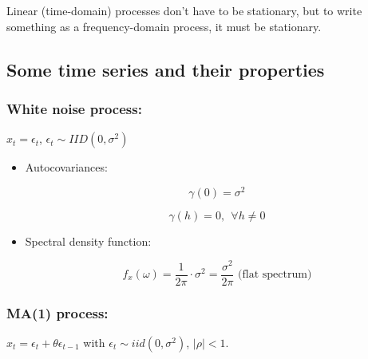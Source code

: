 Linear (time-domain) processes don't have to be stationary, but to write something as a frequency-domain process, it must be stationary.

\subsection{Some time series and their properties}


\subsubsection{White noise process:}  \(x_t = \epsilon_t\), \(\epsilon_t \sim IID(0, \sigma^2)\)

\begin{itemize}

\item Autocovariances: 

\[
\gamma(0) = \sigma^2
\]

\[
\gamma(h) =0, \ \ \forall h \neq 0
\]

\item Spectral density function:

\[
f_x(\omega) = \frac{1}{2\pi} \cdot \sigma^2 = \frac{\sigma^2}{2 \pi} \text{ (flat spectrum)}
\]

\end{itemize}


\subsubsection{MA(1) process:} \(x_t = \epsilon_t + \theta \epsilon_{t-1}\) with \(\epsilon_t \sim iid(0, \sigma^2)\), \(|\rho| < 1\). 


